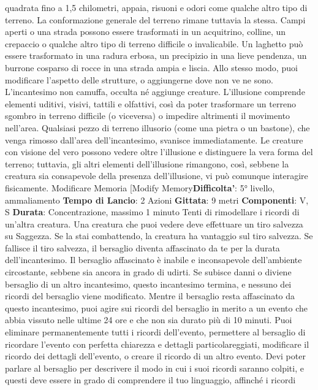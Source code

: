 \begin{multicols}{2}
quadrata fino a 1,5 chilometri, appaia, risuoni e odori
come qualche altro tipo di terreno. La conformazione
generale del terreno rimane tuttavia la stessa. Campi
aperti o una strada possono essere trasformati in un
acquitrino, colline, un crepaccio o qualche altro tipo di
terreno difficile o invalicabile. Un laghetto può essere
trasformato in una radura erbosa, un precipizio in una
lieve pendenza, un burrone cosparso di rocce in una
strada ampia e liscia.
Allo stesso modo, puoi modificare l’aspetto delle
strutture, o aggiungerne dove non ve ne sono.
L’incantesimo non camuffa, occulta né aggiunge
creature.
L’illusione comprende elementi uditivi, visivi, tattili e
olfattivi, così da poter trasformare un terreno sgombro
in terreno difficile (o viceversa) o impedire altrimenti il
movimento nell’area. Qualsiasi pezzo di terreno illusorio
(come una pietra o un bastone), che venga rimosso
dall’area dell’incantesimo, svanisce immediatamente.
Le creature con visione del vero possono vedere oltre
l’illusione e distinguere la vera forma del terreno;
tuttavia, gli altri elementi dell’illusione rimangono, così,
sebbene la creatura sia consapevole della presenza
dell’illusione, vi può comunque interagire fisicamente.
Modificare Memoria
[Modify Memory\textbf{Difficolta'}:
5° livello, ammaliamento
\textbf{Tempo di Lancio}: 2 Azioni
\textbf{Gittata}: 9 metri
\textbf{Componenti}: V, S
\textbf{Durata}: Concentrazione, massimo 1 minuto
Tenti di rimodellare i ricordi di un’altra creatura. Una
creatura che puoi vedere deve effettuare un tiro
salvezza su Saggezza. Se la stai combattendo, la
creatura ha vantaggio sul tiro salvezza. Se fallisce il tiro
salvezza, il bersaglio diventa affascinato da te per la
durata dell’incantesimo. Il bersaglio affascinato è inabile
e inconsapevole dell’ambiente circostante, sebbene sia
ancora in grado di udirti. Se subisce danni o diviene
bersaglio di un altro incantesimo, questo incantesimo 
termina, e nessuno dei ricordi del bersaglio viene
modificato.
Mentre il bersaglio resta affascinato da questo
incantesimo, puoi agire sui ricordi del bersaglio in
merito a un evento che abbia vissuto nelle ultime 24 ore
e che non sia durato più di 10 minuti. Puoi eliminare
permanentemente tutti i ricordi dell’evento, permettere
al bersaglio di ricordare l’evento con perfetta chiarezza
e dettagli particolareggiati, modificare il ricordo dei
dettagli dell’evento, o creare il ricordo di un altro evento.
Devi poter parlare al bersaglio per descrivere il modo in
cui i suoi ricordi saranno colpiti, e questi deve essere in
grado di comprendere il tuo linguaggio, affinché i ricordi

\end{multicols}
